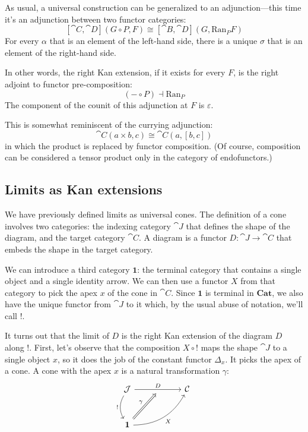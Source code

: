 \documentclass[DaoFP]{subfiles}
\begin{document}
As usual, a universal construction can be generalized to an adjunction---this time it's an adjunction between two functor categories:
\[ [\cat C, \cat D](G \circ P, F) \cong [\cat B, \cat D](G, \text{Ran}_P F) \]
For every $\alpha$ that is an element of the left-hand side, there is a unique $\sigma$ that is an element of the right-hand side.

In other words, the right Kan extension, if it exists for every $F$, is the right adjoint to functor pre-composition:
\[ (- \circ P) \dashv \text{Ran}_P \]
The component of the counit of this adjunction at $F$ is $\varepsilon$.

This is somewhat reminiscent of the currying adjunction:
\[ \cat C (a \times b, c) \cong \cat C (a, [b, c]) \]
in which the product is replaced by functor composition. (Of course, composition can be considered a tensor product only in the category of endofunctors.)

\subsection{Limits as Kan extensions}
 We have previously defined limits as universal cones. The definition of a cone involves two categories: the indexing category $\cat J$ that defines the shape of the diagram, and the target category $\cat C$. A diagram is a functor $D \colon \cat J \to \cat C$ that embeds the shape in the target category. 
 
 We can introduce a third category $\mathbf 1$: the terminal category that contains a single object and a single identity arrow. We can then use a functor $X$ from that category to pick the apex $x$ of the cone in $\cat C$. Since $\mathbf 1$ is terminal in $\mathbf{Cat}$, we also have the unique functor from $\cat J$ to it which, by the usual abuse of notation, we'll call $!$.
 
It turns out that the limit of $D$ is the right Kan extension of the diagram $D$ along $!$. First, let's observe that the composition $X \circ !$ maps the shape $\cat J$ to a single object $x$, so it does the job of the constant functor $\Delta_x$. It picks the apex of a cone. A cone with the apex $x$ is a natural transformation $\gamma$: 
\[
 \begin{tikzcd} [row sep=1cm, column sep=1cm]
 \cat J
 \arrow[rr, "D", "" {name=ID, below} ]
 \arrow[d, bend right, "!"']
 && \cat C
 \\
 \mathbf 1
  \arrow[urr, bend right, "X"']
 \arrow[Rightarrow, "\gamma",  to=ID]
 \end{tikzcd}
\]
\end{document}
